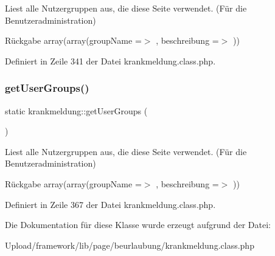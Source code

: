 Liest alle Nutzergruppen aus, die diese Seite verwendet. (Für die Benutzeradministration) \begin{DoxyReturn}{Rückgabe}
array(array(\textquotesingle{}group\+Name\textquotesingle{} =$>$ \textquotesingle{}\textquotesingle{}, \textquotesingle{}beschreibung\textquotesingle{} =$>$ \textquotesingle{}\textquotesingle{})) 
\end{DoxyReturn}


Definiert in Zeile 341 der Datei krankmeldung.\+class.\+php.

\mbox{\label{classkrankmeldung_a9ec5ac0873845d5e4c931c5d575af23e}} 
\subsubsection{\texorpdfstring{get\+User\+Groups()}{getUserGroups()}\hspace{0.1cm}{\footnotesize\ttfamily [2/2]}}
{\footnotesize\ttfamily static krankmeldung\+::get\+User\+Groups (\begin{DoxyParamCaption}{ }\end{DoxyParamCaption})\hspace{0.3cm}{\ttfamily [static]}}

Liest alle Nutzergruppen aus, die diese Seite verwendet. (Für die Benutzeradministration) \begin{DoxyReturn}{Rückgabe}
array(array(\textquotesingle{}group\+Name\textquotesingle{} =$>$ \textquotesingle{}\textquotesingle{}, \textquotesingle{}beschreibung\textquotesingle{} =$>$ \textquotesingle{}\textquotesingle{})) 
\end{DoxyReturn}


Definiert in Zeile 367 der Datei krankmeldung.\+class.\+php.



Die Dokumentation für diese Klasse wurde erzeugt aufgrund der Datei\+:\begin{DoxyCompactItemize}
\item 
Upload/framework/lib/page/beurlaubung/krankmeldung.\+class.\+php\end{DoxyCompactItemize}
